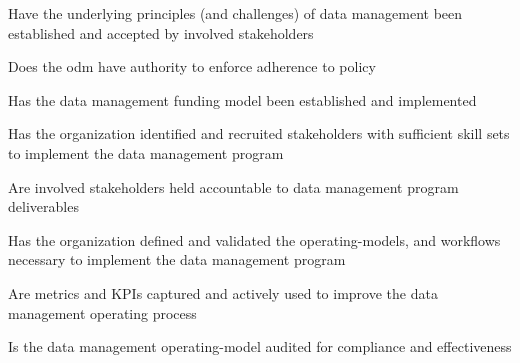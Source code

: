 %
%



\begin{maturity-dimensions}

  \item Have the underlying principles (and challenges) of data management been established and
        accepted by involved stakeholders
  \item Does the \gls{odm} have authority to enforce adherence to policy
  \item Has the data management funding model been established and implemented
  \item Has the organization identified and recruited stakeholders with sufficient skill sets to
        implement the data management program
  \item Are involved stakeholders held accountable to data management program deliverables
  \item Has the organization defined and validated the \glspl{operating-model},
        and workflows necessary to implement the data management program
  \item Are metrics and KPIs captured and actively used to improve the data management operating process
  \item Is the data management \gls{operating-model} audited for compliance and effectiveness

\end{maturity-dimensions}

